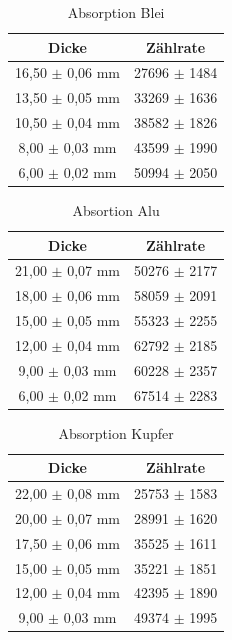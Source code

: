 \documentclass[
	parskip=half,10pt,
	numbers= noenddot, %
	toc=flat, %
	oneside,
	twocolumn,
	]{scrartcl}
\begin{document}
\begin{appendix}
\begin{table}[h]
\centering
\begin{tabular}{cc}
 Dicke & Zählrate  \\
 \hline 
 16,50 $\pm$ 0,06 mm & 27696 $\pm$ 1484  \\
 13,50 $\pm$ 0,05 mm & 33269 $\pm$ 1636  \\
 10,50 $\pm$ 0,04 mm & 38582 $\pm$ 1826  \\
  8,00 $\pm$ 0,03 mm & 43599 $\pm$ 1990  \\
  6,00 $\pm$ 0,02 mm & 50994 $\pm$ 2050  \\
\end{tabular}
\caption{Absorption Blei}
\label{tab:abs_blei}
\end{table}

\begin{table}[h]
\centering
\begin{tabular}{cc}
 Dicke & Zählrate \\
 \hline 
 21,00 $\pm$ 0,07 mm & 50276 $\pm$ 2177  \\
 18,00 $\pm$ 0,06 mm & 58059 $\pm$ 2091  \\
 15,00 $\pm$ 0,05 mm & 55323 $\pm$ 2255  \\
 12,00 $\pm$ 0,04 mm & 62792 $\pm$ 2185  \\
  9,00 $\pm$ 0,03 mm & 60228 $\pm$ 2357  \\
  6,00 $\pm$ 0,02 mm & 67514 $\pm$ 2283  \\
\end{tabular}
\caption{Absortion Alu}
\label{tab:abs_alu}
\end{table}

\begin{table}[h]
\centering
\begin{tabular}{cc}
 Dicke & Zählrate \\
 \hline
 22,00 $\pm$ 0,08 mm & 25753 $\pm$ 1583  \\
 20,00 $\pm$ 0,07 mm & 28991 $\pm$ 1620  \\
 17,50 $\pm$ 0,06 mm & 35525 $\pm$ 1611  \\
 15,00 $\pm$ 0,05 mm & 35221 $\pm$ 1851  \\
 12,00 $\pm$ 0,04 mm & 42395 $\pm$ 1890  \\
  9,00 $\pm$ 0,03 mm & 49374 $\pm$ 1995  \\
\end{tabular}
\caption{Absorption Kupfer}
\label{tab:abs_kupfer}
\end{table}
\end{appendix}
\end{document}
